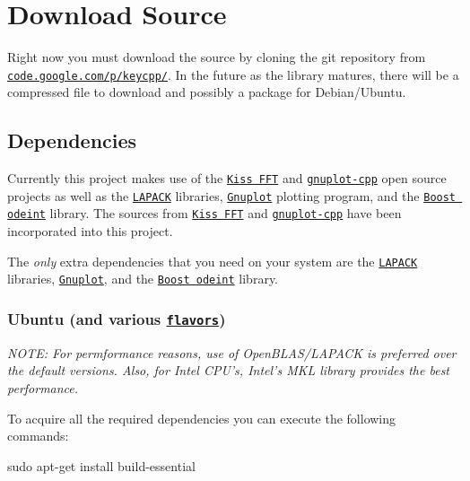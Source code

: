 \section*{Download Source}

Right now you must download the source by cloning the git repository from \href{http://code.google.com/p/keycpp/source/checkout}{\tt code.\-google.\-com/p/keycpp/}. In the future as the library matures, there will be a compressed file to download and possibly a package for Debian/\-Ubuntu.

\subsection*{Dependencies}

Currently this project makes use of the \href{http://www.sourceforge.net/projects/kissfft/}{\tt Kiss F\-F\-T} and \href{http://code.google.com/p/gnuplot-cpp/}{\tt gnuplot-\/cpp} open source projects as well as the \href{http://www.netlib.org/lapack/}{\tt L\-A\-P\-A\-C\-K} libraries, \href{http://www.gnuplot.info/}{\tt Gnuplot} plotting program, and the \href{http://www.boost.org/doc/libs/1_54_0/libs/numeric/odeint/doc/html/index.html}{\tt Boost odeint} library. The sources from \href{http://www.sourceforge.net/projects/kissfft/}{\tt Kiss F\-F\-T} and \href{http://code.google.com/p/gnuplot-cpp/}{\tt gnuplot-\/cpp} have been incorporated into this project.

The {\itshape only} extra dependencies that you need on your system are the \href{http://www.netlib.org/lapack/}{\tt L\-A\-P\-A\-C\-K} libraries, \href{http://www.gnuplot.info/}{\tt Gnuplot}, and the \href{http://www.boost.org/doc/libs/1_54_0/libs/numeric/odeint/doc/html/index.html}{\tt Boost odeint} library.

\subsubsection*{Ubuntu (and various \href{https://wiki.ubuntu.com/UbuntuFlavors}{\tt flavors})}

{\itshape N\-O\-T\-E\-: For permformance reasons, use of Open\-B\-L\-A\-S/\-L\-A\-P\-A\-C\-K is preferred over the default versions. Also, for Intel C\-P\-U's, Intel's M\-K\-L library provides the best performance.}

To acquire all the required dependencies you can execute the following commands\-:

{\ttfamily sudo apt-\/get install build-\/essential}

